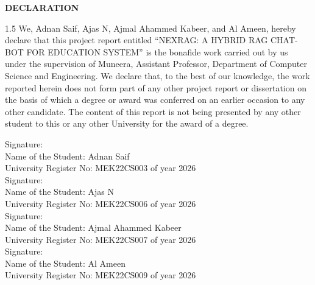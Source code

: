 \newpage
\begin{center}
            \textbf{\large DECLARATION}
\end{center}
\vspace{0.2cm}
  
\fontsize{12}{14}\selectfont
\begin{spacing}{1.5}
            We, Adnan Saif, Ajas N, Ajmal Ahammed Kabeer, and Al Ameen, hereby declare that this project report entitled ``NEXRAG: A HYBRID RAG CHAT-BOT FOR EDUCATION SYSTEM'' is the bonafide work carried out by us under the supervision of Muneera, Assistant Professor, Department of Computer Science and Engineering. We declare that, to the best of our knowledge, the work reported herein does not form part of any other project report or dissertation on the basis of which a degree or award was conferred on an earlier occasion to any other candidate. The content of this report is not being presented by any other student to this or any other University for the award of a degree.
\end{spacing}
  \vspace{0.2cm}
\noindent Signature: \\[0.2cm]
\noindent Name of the Student: Adnan Saif\\[0.1cm]
\noindent University Register No: MEK22CS003 \hspace{0.3cm} of year 2026\\[0.2cm]

\noindent Signature: \\[0.2cm]
\noindent Name of the Student: Ajas N\\[0.1cm]
\noindent University Register No: MEK22CS006 \hspace{0.3cm} of year 2026\\[0.2cm]

\noindent Signature: \\[0.2cm]
\noindent Name of the Student: Ajmal Ahammed Kabeer\\[0.1cm]
\noindent University Register No: MEK22CS007 \hspace{0.3cm} of year 2026\\[0.2cm]

\noindent Signature: \\[0.2cm]
\noindent Name of the Student: Al Ameen\\[0.1cm]
\noindent University Register No: MEK22CS009 \hspace{0.3cm} of year 2026\\[0.2cm]

